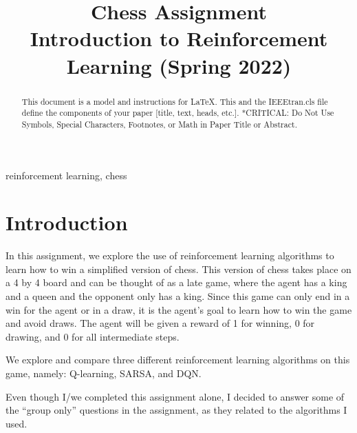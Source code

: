 \documentclass[conference]{IEEEtran}
\begin{document}
\title{Chess Assignment\\
{\footnotesize Introduction to Reinforcement Learning (Spring 2022)}
}

\author{
}

\maketitle

\begin{abstract}
    \color{red}
    This document is a model and instructions for \LaTeX.
    This and the IEEEtran.cls file define the components of your paper [title, text, heads, etc.]. *CRITICAL: Do Not Use Symbols, Special Characters, Footnotes, 
    or Math in Paper Title or Abstract.
\end{abstract}

\begin{IEEEkeywords}
    \color{red}
    reinforcement learning, chess
\end{IEEEkeywords}






\section{Introduction}\label{sec:introduction}

In this assignment, we explore the use of reinforcement learning algorithms to learn how to win a simplified version of chess. This version of chess takes place on a 4 by 4 board and can be thought of as a late game, where the agent has a king and a queen and the opponent only has a king. Since this game can only end in a win for the agent or in a draw, it is the agent's goal to learn how to win the game and avoid draws. The agent will be given a reward of 1 for winning, 0 for drawing, and 0 for all intermediate steps.

We explore and compare three different reinforcement learning algorithms on this game, namely: Q-learning, SARSA, and DQN.


Even though I/we completed this assignment alone, I decided to answer some of the ``group only'' questions in the assignment, as they related to the algorithms I used.
\end{document}
